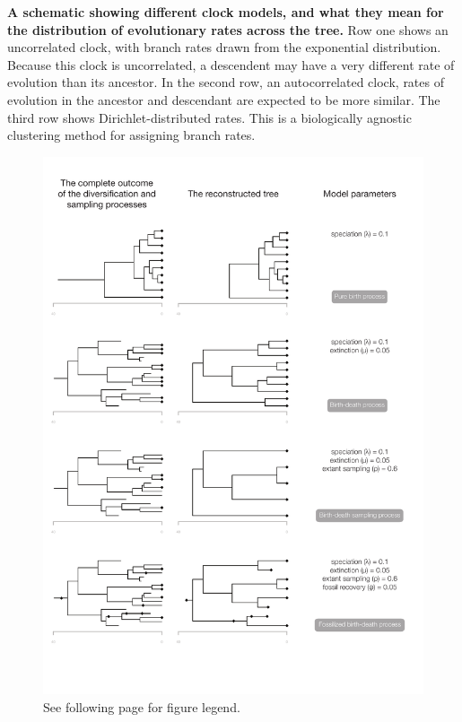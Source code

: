 \documentclass[11pt]{article}
\begin{document}
\clearpage

\caption{\footnotesize \textbf{A schematic showing different clock models, and what they mean for the distribution of evolutionary rates across the tree.} Row one shows an uncorrelated clock, with branch rates drawn from the exponential distribution. Because this clock is uncorrelated, a descendent may have a very different rate of evolution than its ancestor. In the second row, an autocorrelated clock, rates of evolution in the ancestor and descendant are expected to be more similar. The third row shows Dirichlet-distributed rates. This is a biologically agnostic clustering method for assigning branch rates.
}

\clearpage


\begin{figure}
\centering
\includegraphics[width=\textwidth]{figures/birth-death-trees-v2.pdf}
\caption{\footnotesize See following page for figure legend.
}
\label{fig:birth-death}
\end{figure}
\end{document}
